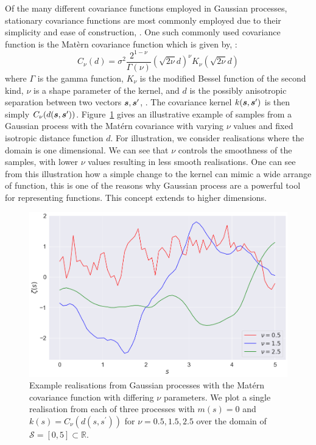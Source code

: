 Of the many different covariance functions employed in Gaussian processes, stationary covariance functions are most commonly employed due to their simplicity and ease of construction, \citep{cressie_statistics_2010}.
One such commonly used covariance function is the Mat\`{e}rn covariance function which is given by, \citep{abramowitz_handbook_2013}: 
\begin{equation}\label{eqn:mat}
	C_\nu(d) = \sigma^2 \frac{2^{1-\nu}}{\Gamma(\nu)} \left(\sqrt{2\nu}d\right)^\nu K_\nu \left( \sqrt{2\nu}d \right) 
\end{equation}
where $\Gamma$ is the gamma function, $K_\nu$ is the modified Bessel function of the second kind, $\nu$ is a shape parameter of the kernel, and $d$ is the possibly anisotropic separation between two vectors $\bm{{s}}, \bm{{s}}^{\prime}$, \citep{abramowitz_handbook_2013}. 
The covariance kernel $k(\bm{{s}}, \bm{{s}}^{\prime})$ is then simply $C_\nu(d(\bm{{s}}, \bm{{s}}^{\prime}))$.
Figure~\ref{fig:example_matern} gives an illustrative example of samples from a Gaussian process with the Mat\'ern covariance with varying $\nu$ values and fixed isotropic distance function $d$.
For illustration, we consider realisations where the domain is one dimensional.
We can see that $\nu$ controls the smoothness of the samples, with lower $\nu$ values resulting in less smooth realisations.
One can see from this illustration how a simple change to the kernel can mimic a wide arrange of function, this is one of the reasons why Gaussian process are a powerful tool for representing functions.
This concept extends to higher dimensions.

\begin{figure}[htbp!] 
	\centering    
	\includegraphics[width=1.0\textwidth]{example_kernel}
	\caption[Example realisations from Gaussian processes with the Mat\'ern covariance function with differing $\nu$ parameters.]{Example realisations from Gaussian processes with the Mat\'ern covariance function with differing $\nu$ parameters. We plot a single realisation from each of three processes with $m(s) = 0$ and $k(s) = C_\nu(d(s, s^\prime))$ for $\nu = 0.5, 1.5, 2.5$ over the domain of $\mathcal{S} = \left[0, 5\right] \subset \mathbb{R}$.}
	\label{fig:example_matern}
\end{figure}

